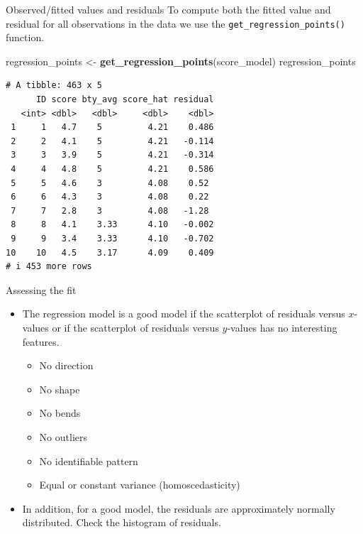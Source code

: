 \documentclass[
  ignorenonframetext,
]{beamer}
\newenvironment{Shaded}{\begin{snugshade}}{\end{snugshade}}
\newcommand{\FunctionTok}[1]{\textcolor[rgb]{0.13,0.29,0.53}{\textbf{#1}}}
\newcommand{\NormalTok}[1]{#1}
\newcommand{\OtherTok}[1]{\textcolor[rgb]{0.56,0.35,0.01}{#1}}
\providecommand{\tightlist}{%
  \setlength{\itemsep}{0pt}\setlength{\parskip}{0pt}}
\begin{document}
\begin{frame}[fragile]{Observed/fitted values and residuals}
\protect\hypertarget{observedfitted-values-and-residuals-2}{}
To compute both the fitted value and residual for all observations in
the data we use the \texttt{get\_regression\_points()} function.

\small

\begin{Shaded}
\begin{Highlighting}[]
\NormalTok{regression\_points }\OtherTok{\textless{}{-}} \FunctionTok{get\_regression\_points}\NormalTok{(score\_model)}
\NormalTok{regression\_points}
\end{Highlighting}
\end{Shaded}

\begin{verbatim}
# A tibble: 463 x 5
      ID score bty_avg score_hat residual
   <int> <dbl>   <dbl>     <dbl>    <dbl>
 1     1   4.7    5         4.21    0.486
 2     2   4.1    5         4.21   -0.114
 3     3   3.9    5         4.21   -0.314
 4     4   4.8    5         4.21    0.586
 5     5   4.6    3         4.08    0.52 
 6     6   4.3    3         4.08    0.22 
 7     7   2.8    3         4.08   -1.28 
 8     8   4.1    3.33      4.10   -0.002
 9     9   3.4    3.33      4.10   -0.702
10    10   4.5    3.17      4.09    0.409
# i 453 more rows
\end{verbatim}

\normalsize
\end{frame}

\begin{frame}{Assessing the fit}
\protect\hypertarget{assessing-the-fit}{}
\begin{itemize}
\item
  The regression model is a good model if the scatterplot of residuals
  versus \(x\)-values or if the scatterplot of residuals versus
  \(\hat{y}\)-values has no interesting features.

  \begin{itemize}
  \tightlist
  \item
    No direction
  \item
    No shape
  \item
    No bends
  \item
    No outliers
  \item
    No identifiable pattern
  \item
    Equal or constant variance (homoscedasticity)
  \end{itemize}
\item
  In addition, for a good model, the residuals are approximately
  normally distributed. Check the histogram of residuals.
\end{itemize}
\end{frame}
\end{document}
